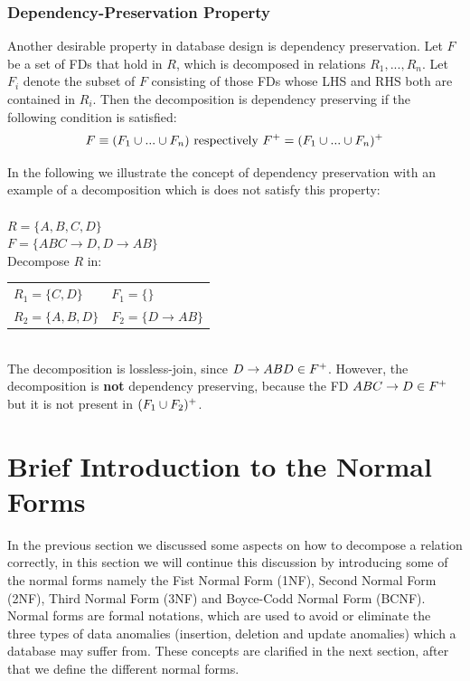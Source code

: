 \subsubsection{Dependency-Preservation Property}
Another desirable property in database design is dependency preservation. 
Let $F$ be a set of FDs that hold in $R$, which is decomposed in relations $R_1 ,..., R_n$.
Let $F_i$ denote the subset of $F$ consisting of those FDs whose LHS
and RHS both are contained in $R_i$. Then the decomposition is
dependency preserving if the following condition is satisfied: 
\begin{displaymath}
F \equiv (F_1 \cup ... \cup F_n ) \mbox{  respectively  } F\sp{+} = (F_1 \cup ... \cup F_n )\sp{+}
\end{displaymath}

In the following we illustrate the concept of dependency preservation with an example
of a decomposition which is does not satisfy this property: \\ \\
\indent $R = \{A, B, C, D\}$ \\
\indent $F = \{ABC \rightarrow D, D \rightarrow AB\}$ \\
\indent Decompose $R$ in: \\
\indent \begin{tabular}[h]{l l}
  $R_1 = \{C, D\}$  & $F_1 = \{ \}$ \\
  $R_2 = \{A,B,D\}$ & $F_2 = \{D \rightarrow AB \}$ \\
\end{tabular} \\

The decomposition is lossless-join, since $D \rightarrow ABD \in F\sp{+}$. However, 
the decomposition is \textbf{not} dependency preserving, because the FD $ABC \rightarrow D \in F\sp{+}$ but it is
not present in $(F_1 \cup F_2)\sp{+}$.

\section{Brief Introduction to the Normal Forms}
\label{sec:nfintro}
In the previous section we discussed some aspects on how to decompose a relation correctly, 
in this section we will continue this discussion by introducing some of the normal forms
namely the Fist Normal Form (1NF), Second Normal Form (2NF), Third Normal Form (3NF) and
Boyce-Codd Normal Form (BCNF). Normal forms are formal
notations, which are used to avoid or eliminate the three types of data anomalies 
(insertion, deletion and update anomalies) which a database may suffer from. 
These concepts are clarified in the next section, after that we
define the different normal forms.

